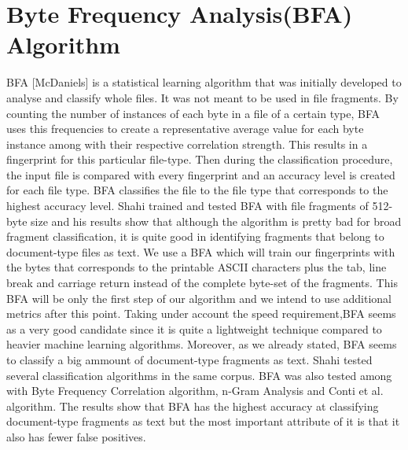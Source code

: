 \section{Byte Frequency Analysis(BFA) Algorithm}
BFA [McDaniels] is a statistical learning algorithm that was initially developed to analyse and classify whole files. It was not meant to be used in file fragments. By counting the number of instances of each byte in a file of a certain type, BFA uses this frequencies to create a representative average value for each byte instance among with their respective correlation strength. This results in a fingerprint for this particular file-type. Then during the classification procedure, the input file is compared with every fingerprint and an accuracy level is created for each file type. BFA classifies the file to the file type that corresponds to the highest accuracy level.
 Shahi trained and tested BFA with file fragments of 512-byte size and his results show that although the algorithm is pretty bad for broad fragment classification, it is quite good in identifying fragments that belong to document-type files as text. We use a BFA which will train our fingerprints with the bytes that corresponds to the printable ASCII characters plus the tab, line break and carriage return instead of the complete byte-set of the fragments. This BFA will be only the first step of our algorithm and we intend to use additional metrics after this point. Taking under account the speed requirement,BFA seems as a very good candidate since it is quite a lightweight technique compared to heavier machine learning algorithms. Moreover, as we already stated, BFA seems to classify a big ammount of document-type fragments as text. Shahi tested several classification algorithms in the same corpus. BFA was also tested among with Byte Frequency Correlation algorithm, n-Gram Analysis and Conti et al. algorithm. The results show that BFA has the highest accuracy at classifying document-type fragments as text but the most important attribute of it is that it also has fewer false positives.



